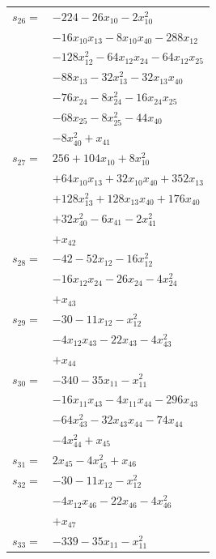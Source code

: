 \begin{longtable}{@{}r@{\;}l@{}}
\(s_{26}=\) & \(\displaystyle -224 -26x_{10} -2x_{10}^{2}\) \\
 & \(\displaystyle -16x_{10}x_{13} -8x_{10}x_{40} -288x_{12}\) \\
 & \(\displaystyle -128x_{12}^{2} -64x_{12}x_{24} -64x_{12}x_{25}\) \\
 & \(\displaystyle -88x_{13} -32x_{13}^{2} -32x_{13}x_{40}\) \\
 & \(\displaystyle -76x_{24} -8x_{24}^{2} -16x_{24}x_{25}\) \\
 & \(\displaystyle -68x_{25} -8x_{25}^{2} -44x_{40}\) \\
 & \(\displaystyle -8x_{40}^{2} +x_{41}\) \\[3pt]
\(s_{27}=\) & \(\displaystyle 256 +104x_{10} +8x_{10}^{2}\) \\
 & \(\displaystyle +64x_{10}x_{13} +32x_{10}x_{40} +352x_{13}\) \\
 & \(\displaystyle +128x_{13}^{2} +128x_{13}x_{40} +176x_{40}\) \\
 & \(\displaystyle +32x_{40}^{2} -6x_{41} -2x_{41}^{2}\) \\
 & \(\displaystyle +x_{42}\) \\[3pt]
\(s_{28}=\) & \(\displaystyle -42 -52x_{12} -16x_{12}^{2}\) \\
 & \(\displaystyle -16x_{12}x_{24} -26x_{24} -4x_{24}^{2}\) \\
 & \(\displaystyle +x_{43}\) \\[3pt]
\(s_{29}=\) & \(\displaystyle -30 -11x_{12} -x_{12}^{2}\) \\
 & \(\displaystyle -4x_{12}x_{43} -22x_{43} -4x_{43}^{2}\) \\
 & \(\displaystyle +x_{44}\) \\[3pt]
\(s_{30}=\) & \(\displaystyle -340 -35x_{11} -x_{11}^{2}\) \\
 & \(\displaystyle -16x_{11}x_{43} -4x_{11}x_{44} -296x_{43}\) \\
 & \(\displaystyle -64x_{43}^{2} -32x_{43}x_{44} -74x_{44}\) \\
 & \(\displaystyle -4x_{44}^{2} +x_{45}\) \\[3pt]
\(s_{31}=\) & \(\displaystyle 2x_{45} -4x_{45}^{2} +x_{46}\) \\[3pt]
\(s_{32}=\) & \(\displaystyle -30 -11x_{12} -x_{12}^{2}\) \\
 & \(\displaystyle -4x_{12}x_{46} -22x_{46} -4x_{46}^{2}\) \\
 & \(\displaystyle +x_{47}\) \\[3pt]
\(s_{33}=\) & \(\displaystyle -339 -35x_{11} -x_{11}^{2}\) \\

\end{longtable}
